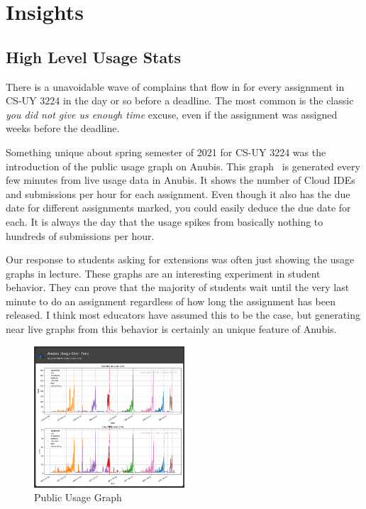\chapter{Insights}\label{ch:insights}

\section{High Level Usage Stats}\label{sec:high-level-usage-stats}

There is a unavoidable wave of complains that flow in for every assignment in CS-UY 3224
in the day or so before a deadline.
The most common is the classic \textit{you did not give us enough time} excuse,
even if the assignment was assigned weeks before the deadline.

Something unique about spring semester of 2021 for CS-UY 3224 was the introduction of the public usage graph on Anubis.
This graph~ is generated every few minutes from live usage data in Anubis.
It shows the number of Cloud IDEs and submissions per hour for each assignment.
Even though it also has the due date for different assignments marked, you could easily deduce the
due date for each.
It is always the day that the usage spikes from basically nothing to hundreds of submissions per hour.

Our response to students asking for extensions was often just showing the usage graphs in lecture.
These graphs are an interesting experiment in student behavior.
They can prove that the majority of students wait until the very last minute to do an assignment
regardless of how long the assignment has been released.
I think most educators have assumed this to be the case, but generating near live graphs from 
this behavior is certainly an unique feature of Anubis.  

\begin{figure}[ht]
    \centering
    \includegraphics[width=0.5\textwidth]{figures/public-usage-1.png}
    \caption{Public Usage Graph\label{fig:public-usage}}
\end{figure}

